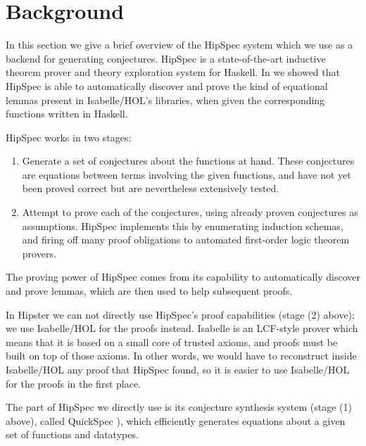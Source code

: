 \section{Background}
\label{sec:background}

In this section we give a brief overview of the HipSpec system which
we use as a backend for generating conjectures. HipSpec is a
state-of-the-art inductive theorem prover and theory exploration
system for Haskell. In \cite{hipspecCADE} we showed that HipSpec is
able to automatically discover and prove the kind of equational lemmas present in
Isabelle/HOL's libraries, when given the corresponding functions written in Haskell.

HipSpec works in two stages:
\begin{enumerate}
\item Generate a set of conjectures about the functions at hand. These
  conjectures are equations between terms involving the given
  functions, and have not yet been proved correct but are nevertheless
  extensively tested.

\item Attempt to prove each of the conjectures, using already proven conjectures as assumptions. HipSpec implements this by enumerating induction schemas, and firing off many proof obligations to automated first-order logic theorem provers.
\end{enumerate}
The proving power of HipSpec comes from its capability to
automatically discover and prove lemmas, which are then used to help
subsequent proofs.


In Hipster we can not directly use HipSpec's
proof capabilities (stage (2) above); we use Isabelle/HOL for the proofs instead. Isabelle  is an LCF-style prover which means that it
is based on a small core of trusted axioms, and proofs must be built
on top of those axioms. In other words, we would have to reconstruct
inside Isabelle/HOL any proof that HipSpec found, so it is easier
to use Isabelle/HOL for the proofs in the first place. 

The part of HipSpec we directly use
is its conjecture synthesis system (stage (1) above), called QuickSpec \cite{quickspec}),
which efficiently generates equations about a given set of functions and
datatypes.

